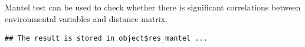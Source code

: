 \documentclass[
]{book}
\newenvironment{Shaded}{\begin{snugshade}}{\end{snugshade}}
\newcommand{\AttributeTok}[1]{\textcolor[rgb]{0.77,0.63,0.00}{#1}}
\newcommand{\CommentTok}[1]{\textcolor[rgb]{0.56,0.35,0.01}{\textit{#1}}}
\newcommand{\FunctionTok}[1]{\textcolor[rgb]{0.00,0.00,0.00}{#1}}
\newcommand{\NormalTok}[1]{#1}
\newcommand{\SpecialCharTok}[1]{\textcolor[rgb]{0.00,0.00,0.00}{#1}}
\newcommand{\StringTok}[1]{\textcolor[rgb]{0.31,0.60,0.02}{#1}}
\begin{document}
Mantel test can be used to check whether there is significant correlations between environmental variables and distance matrix.

\begin{Shaded}
\end{Shaded}

\begin{verbatim}
## The result is stored in object$res_mantel ...
\end{verbatim}
\end{document}
